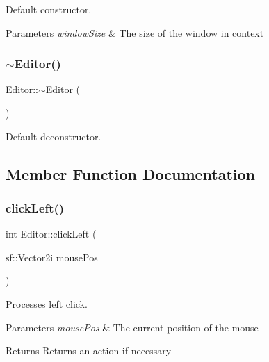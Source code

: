 Default constructor. 


\begin{DoxyParams}{Parameters}
{\em window\+Size} & The size of the window in context \\
\hline
\end{DoxyParams}
\mbox{\label{class_editor_ad465abc9575af92b4fa61525085172d6}} 
\subsubsection{\texorpdfstring{$\sim$\+Editor()}{~Editor()}}
{\footnotesize\ttfamily Editor\+::$\sim$\+Editor (\begin{DoxyParamCaption}{ }\end{DoxyParamCaption})}



Default deconstructor. 



\subsection{Member Function Documentation}
\mbox{\label{class_editor_abb3e1cbf4e8b75f7550e45bfb3cc766a}} 
\subsubsection{\texorpdfstring{click\+Left()}{clickLeft()}}
{\footnotesize\ttfamily int Editor\+::click\+Left (\begin{DoxyParamCaption}\item[{sf\+::\+Vector2i}]{mouse\+Pos }\end{DoxyParamCaption})}



Processes left click. 


\begin{DoxyParams}{Parameters}
{\em mouse\+Pos} & The current position of the mouse \\
\hline
\end{DoxyParams}
\begin{DoxyReturn}{Returns}
Returns an action if necessary 
\end{DoxyReturn}
\mbox{\label{class_editor_ab3a445fd47d3eb0ff5abcbb6707dea5c}} 
